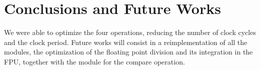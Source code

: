 \section{Conclusions and Future Works}
We were able to optimize the four operations, reducing the number of clock cycles and the clock period. 
Future works will consist in a reimplementation of all the modules, the optimization of the floating point division and its integration in the FPU, together with the module for the compare operation.
